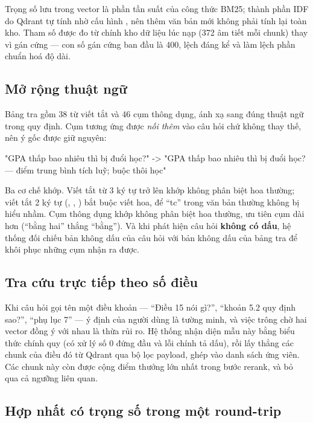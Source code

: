 Trọng số lưu trong vector là phần tần suất của công thức BM25; thành phần IDF do Qdrant tự tính
nhờ cấu hình , nên thêm văn bản mới không phải tính lại toàn kho. Tham số
 được đo từ chính kho dữ liệu lúc nạp (372 âm tiết mỗi chunk) thay vì gán cứng —
con số gán cứng ban đầu là 400, lệch đáng kể và làm lệch phần chuẩn hoá độ dài.

\subsection{Mở rộng thuật ngữ}

Bảng tra gồm 38 từ viết tắt và 46 cụm thông dụng, ánh xạ sang đúng thuật ngữ trong quy định.
Cụm tương ứng được \emph{nối thêm} vào câu hỏi chứ không thay thế, nên ý gốc được giữ nguyên:

\begin{codeblock}
"GPA thấp bao nhiêu thì bị đuổi học?"
  -> "GPA thấp bao nhiêu thì bị đuổi học? — điểm trung bình tích luỹ; buộc thôi học"
\end{codeblock}

Ba cơ chế khớp. Viết tắt từ 3 ký tự trở lên khớp không phân biệt hoa thường; viết tắt 2 ký tự
(, , ) bắt buộc viết hoa, để “tc” trong văn bản thường không bị hiểu
nhầm. Cụm thông dụng khớp không phân biệt hoa thường, ưu tiên cụm dài hơn (“bằng hai” thắng
“bằng”). Và khi phát hiện câu hỏi \textbf{không có dấu}, hệ thống đối chiếu bản không dấu của
câu hỏi với bản không dấu của bảng tra để khôi phục những cụm nhận ra được.

\subsection{Tra cứu trực tiếp theo số điều}

Khi câu hỏi gọi tên một điều khoản — “Điều 15 nói gì?”, “khoản 5.2 quy định sao?”, “phụ lục 7”
— ý định của người dùng là tường minh, và việc trông chờ hai vector đồng ý với nhau là thừa rủi
ro. Hệ thống nhận diện mẫu này bằng biểu thức chính quy (có xử lý số 0 đứng đầu và lỗi chính tả
dấu), rồi lấy thẳng các chunk của điều đó từ Qdrant qua bộ lọc payload, ghép vào danh sách ứng
viên. Các chunk này còn được cộng điểm thưởng lớn nhất trong bước rerank, và bỏ qua cả ngưỡng
liên quan.

\subsection{Hợp nhất có trọng số trong một round-trip}
\label{sec:fusion}

